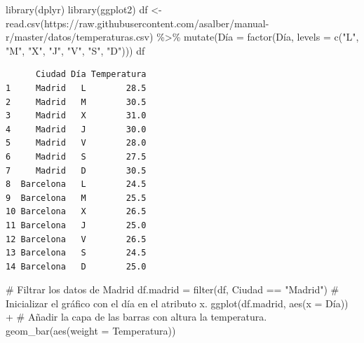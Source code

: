 \documentclass[
  a4paper,
]{scrreport}
\newenvironment{Shaded}{\begin{snugshade}}{\end{snugshade}}
\newcommand{\AttributeTok}[1]{\textcolor[rgb]{0.40,0.45,0.13}{#1}}
\newcommand{\CommentTok}[1]{\textcolor[rgb]{0.37,0.37,0.37}{#1}}
\newcommand{\FunctionTok}[1]{\textcolor[rgb]{0.28,0.35,0.67}{#1}}
\newcommand{\NormalTok}[1]{\textcolor[rgb]{0.00,0.23,0.31}{#1}}
\newcommand{\OtherTok}[1]{\textcolor[rgb]{0.00,0.23,0.31}{#1}}
\newcommand{\SpecialCharTok}[1]{\textcolor[rgb]{0.37,0.37,0.37}{#1}}
\newcommand{\StringTok}[1]{\textcolor[rgb]{0.13,0.47,0.30}{#1}}
\theoremstyle{definition}
\theoremstyle{definition}
\theoremstyle{remark}
\begin{document}
\begin{Shaded}
\begin{Highlighting}[]
\FunctionTok{library}\NormalTok{(dplyr)}
\FunctionTok{library}\NormalTok{(ggplot2)}
\NormalTok{df }\OtherTok{\textless{}{-}} \FunctionTok{read.csv}\NormalTok{(}\StringTok{\textquotesingle{}https://raw.githubusercontent.com/asalber/manual{-}r/master/datos/temperaturas.csv\textquotesingle{}}\NormalTok{) }\SpecialCharTok{\%\textgreater{}\%}
    \FunctionTok{mutate}\NormalTok{(Día }\OtherTok{=} \FunctionTok{factor}\NormalTok{(Día, }\AttributeTok{levels =} \FunctionTok{c}\NormalTok{(}\StringTok{"L"}\NormalTok{, }\StringTok{"M"}\NormalTok{, }\StringTok{"X"}\NormalTok{, }\StringTok{"J"}\NormalTok{, }\StringTok{"V"}\NormalTok{, }\StringTok{"S"}\NormalTok{, }\StringTok{"D"}\NormalTok{)))}
\NormalTok{df}
\end{Highlighting}
\end{Shaded}

\begin{verbatim}
      Ciudad Día Temperatura
1     Madrid   L        28.5
2     Madrid   M        30.5
3     Madrid   X        31.0
4     Madrid   J        30.0
5     Madrid   V        28.0
6     Madrid   S        27.5
7     Madrid   D        30.5
8  Barcelona   L        24.5
9  Barcelona   M        25.5
10 Barcelona   X        26.5
11 Barcelona   J        25.0
12 Barcelona   V        26.5
13 Barcelona   S        24.5
14 Barcelona   D        25.0
\end{verbatim}

\begin{Shaded}
\begin{Highlighting}[]
\CommentTok{\# Filtrar los datos de Madrid}
\NormalTok{df.madrid }\OtherTok{=} \FunctionTok{filter}\NormalTok{(df, Ciudad }\SpecialCharTok{==} \StringTok{"Madrid"}\NormalTok{)}
\CommentTok{\# Inicializar el gráfico con el día en el atributo x.}
\FunctionTok{ggplot}\NormalTok{(df.madrid, }\FunctionTok{aes}\NormalTok{(}\AttributeTok{x =}\NormalTok{ Día)) }\SpecialCharTok{+}
\CommentTok{\# Añadir la capa de las barras con altura la temperatura.}
    \FunctionTok{geom\_bar}\NormalTok{(}\FunctionTok{aes}\NormalTok{(}\AttributeTok{weight =}\NormalTok{ Temperatura))}
\end{Highlighting}
\end{Shaded}
\end{document}
